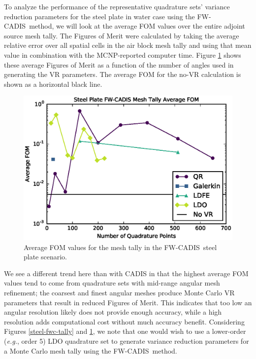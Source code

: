 \documentclass{article} %
\newcommand{\fwc}{\mbox{FW-CADIS}}
\begin{document}
To analyze the performance of the representative quadrature sets' variance
reduction parameters for the steel plate in water case using the \fwc\ method,
we will look at the average FOM values over the entire adjoint source mesh
tally. The Figures of Merit were calculated by taking the average relative
error over all spatial cells in the air block mesh tally and using that mean
value in combination with the MCNP-reported computer time. Figure 
\ref{steel-fwc-fom} shows these average Figures of Merit as a function of the
number of angles used in generating the VR parameters. The average FOM for
the no-VR calculation is shown as a horizontal black line.

\begin{figure}[!htb]
\centering
\includegraphics[max height=0.445\textheight]{steel-fwcadis-fom.eps}
\caption{Average FOM values for the mesh tally in the \fwc\ steel plate scenario.}
\label{steel-fwc-fom}
\end{figure}

We see a different trend here than with CADIS in that the highest average FOM
values tend to come from quadrature sets with mid-range angular mesh
refinement; the coarsest and finest angular meshes produce Monte Carlo VR
parameters that result in reduced Figures of Merit. This indicates that too
low an angular resolution likely does not provide enough accuracy, while a
high resolution adds computational cost without much accuracy benefit.
Considering Figures \ref{steel-fwc-tally} and \ref{steel-fwc-fom}, we note
that one would wish to use a lower-order (\textit{e.g.}, order 5) LDO
quadrature set to generate variance reduction parameters for a Monte Carlo
mesh tally using the \fwc\ method.
\end{document}
